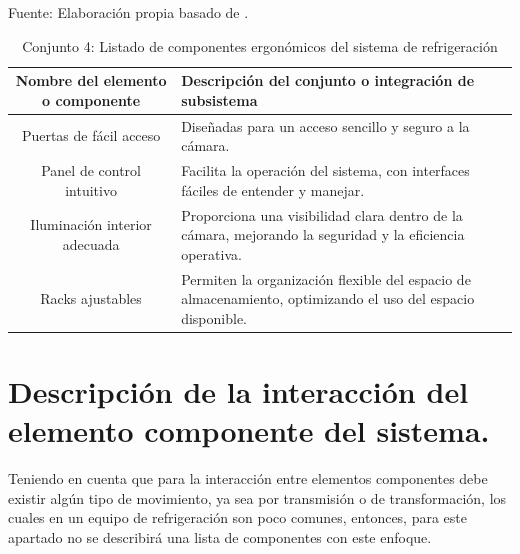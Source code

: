 \begin{table}[H]
	\centering
	\caption{Conjunto 4: Listado de componentes ergonómicos del sistema de refrigeración}
	Fuente: Elaboración propia basado de .
	\begin{tabular}{@{}cl@{}}
		\toprule
		\begin{minipage}[t]{0.25\linewidth}\textbf{Nombre del elemento o componente}\end{minipage} & \begin{minipage}[t]{0.60\linewidth}\textbf{Descripción del conjunto o integración de subsistema}\end{minipage} \\ \midrule
		Puertas de fácil acceso                   & \begin{minipage}[t]{0.6\linewidth}Diseñadas para un acceso sencillo y seguro a la cámara.\end{minipage} \\
		Panel de control intuitivo                & \begin{minipage}[t]{0.6\linewidth}Facilita la operación del sistema, con interfaces fáciles de entender y manejar.\end{minipage} \\
		Iluminación interior adecuada             & \begin{minipage}[t]{0.6\linewidth}Proporciona una visibilidad clara dentro de la cámara, mejorando la seguridad y la eficiencia operativa.\end{minipage} \\
		Racks ajustables                          & \begin{minipage}[t]{0.6\linewidth}Permiten la organización flexible del espacio de almacenamiento, optimizando el uso del espacio disponible.\end{minipage} \\ \bottomrule
	\end{tabular}
	\label{tabla:ergonomia}
\end{table}





\newpage
\section{Descripción de la interacción del elemento componente del sistema.}

Teniendo en cuenta que para la interacción entre elementos componentes debe existir algún tipo de movimiento, ya sea por transmisión o de transformación, los cuales en un equipo de refrigeración son poco comunes, entonces, para este apartado no se describirá una lista de componentes con este enfoque.



